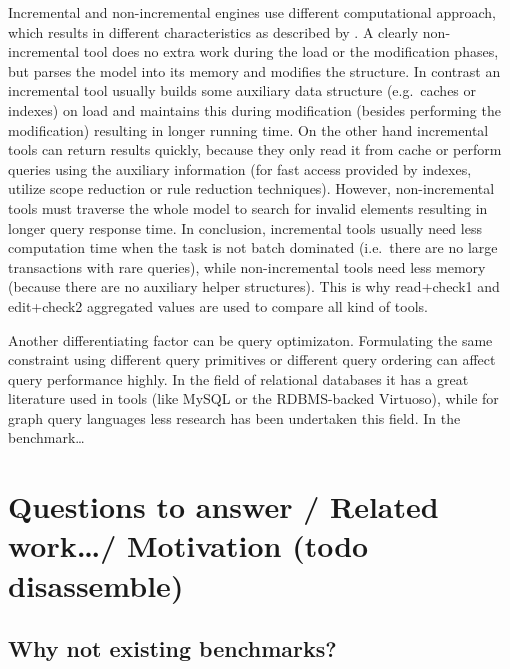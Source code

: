 Incremental and non-incremental engines use different computational approach,
which results in different characteristics as described by
. A clearly non-incremental tool does no extra work
during the load or the modification phases, but parses the model into its memory and
modifies the structure. In contrast an incremental tool usually builds some
auxiliary data structure (e.g.\ caches or indexes) on load and maintains this
during modification (besides performing the modification) resulting in longer running time. On the other hand incremental tools can return results quickly,
because they only read it from cache or perform queries using the auxiliary
information (for fast access provided by indexes, utilize scope reduction or
rule reduction techniques). However, non-incremental tools must traverse the
whole model to search for invalid elements resulting in longer query response
time. In conclusion, incremental tools usually need less computation time when
the task is not batch dominated (i.e.\ there are no large transactions with rare
queries), while non-incremental tools need less memory (because there are no
auxiliary helper structures). This is why read+check1 and edit+check2 aggregated
values are used to compare all kind of tools.

Another differentiating factor can be query optimizaton. Formulating the same
constraint using different query primitives or different query ordering can
affect query performance highly. In the field of relational databases it has a
great literature used in tools (like MySQL or the RDBMS-backed Virtuoso), while
for graph query languages less research has been undertaken this field. 
 In the benchmark\ldots {}

\section{Questions to answer / Related work\ldots / Motivation (todo disassemble)}

\subsection{Why not existing benchmarks?}

